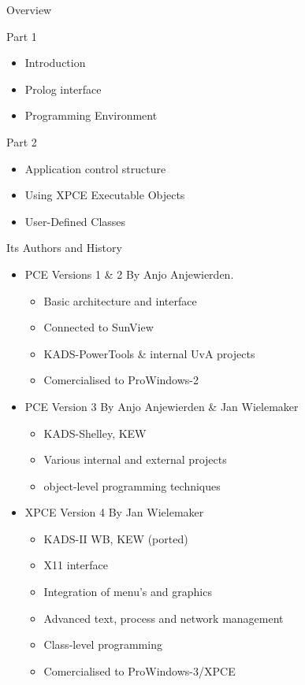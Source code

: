 
\renewcommand{\slinote}{Programming in XPCE/Prolog}





\begin{sli}{Overview}

Part 1

\begin{itemize}
    \item Introduction
    \item Prolog interface
    \item Programming Environment
\end{itemize}

Part 2

\begin{itemize}
    \item Application control structure
    \item Using XPCE Executable Objects
    \item User-Defined Classes
\end{itemize}
\end{sli}


\begin{sli}{Its Authors and History}

\begin{itemize}
    \item{PCE Versions 1 \& 2 By Anjo Anjewierden.}
    \begin{itemize}
        \item Basic architecture and interface
	\item Connected to SunView
	\item KADS-PowerTools \& internal UvA projects
	\item Comercialised to ProWindows-2
    \end{itemize}
    \item{PCE Version 3 By Anjo Anjewierden \& Jan Wielemaker}
    \begin{itemize}
        \item KADS-Shelley, KEW
	\item Various internal and external projects
	\item object-level programming techniques
    \end{itemize}
    \item{XPCE Version 4 By Jan Wielemaker}
    \begin{itemize}
	\item KADS-II WB, KEW (ported)
	\item X11 interface
	\item Integration of menu's and graphics
	\item Advanced text, process and network management
	\item Class-level programming
	\item Comercialised to ProWindows-3/XPCE
    \end{itemize}
\end{itemize}
\end{sli}



